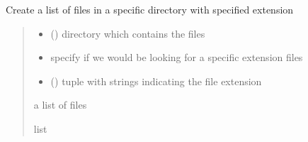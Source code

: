 \documentclass[letterpaper,10pt,english]{sphinxmanual}
\begin{document}
\begin{fulllineitems}
\label{\detokenize{auxilary_functions:auxilary_functions.get_file_names}}
\pysigstartsignatures
{}
\pysigstopsignatures
\sphinxAtStartPar
Create a list of files in a specific directory with specified extension
\begin{quote}\begin{description}
\begin{itemize}
\item {} 
\sphinxAtStartPar
{} () \textendash{} directory which contains the files

\item {} 
\sphinxAtStartPar
{} \textendash{} specify if we would be looking for a specific extension files

\item {} 
\sphinxAtStartPar
{} () \textendash{} tuple with strings indicating the file extension

\end{itemize}

\sphinxAtStartPar
a list of files

\sphinxAtStartPar
list

\end{description}\end{quote}

\end{fulllineitems}

\end{document}
